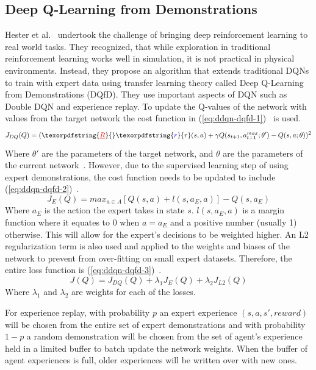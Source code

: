 \documentclass[12pt,american]{report}
\providecommand{\DIFaddtex}[1]{{\protect\color{blue}\uwave{#1}}} %
\providecommand{\DIFdeltex}[1]{{\protect\color{red}\sout{#1}}}                      %
\providecommand{\DIFaddbegin}{} %
\providecommand{\DIFaddend}{} %
\providecommand{\DIFdelbegin}{} %
\providecommand{\DIFdelend}{} %
\providecommand{\DIFadd}[1]{\texorpdfstring{\DIFaddtex{#1}}{#1}} %
\providecommand{\DIFdel}[1]{\texorpdfstring{\DIFdeltex{#1}}{}} %
\newcommand{\DIFscaledelfig}{0.5}
\newlength{\DIFdelgraphicswidth} %
\newlength{\DIFdelgraphicsheight} %
\newcommand{\DIFaddincludegraphics}[2][]{{\color{blue}\fbox{\DIFOincludegraphics[#1]{#2}}}} %
\newcommand{\DIFdelincludegraphics}[2][]{%
\sbox{\DIFdelgraphicsbox}{\DIFOincludegraphics[#1]{#2}}%
\settoboxwidth{\DIFdelgraphicswidth}{\DIFdelgraphicsbox} %
\settoboxtotalheight{\DIFdelgraphicsheight}{\DIFdelgraphicsbox} %
\scalebox{\DIFscaledelfig}{%
\parbox[b]{\DIFdelgraphicswidth}{\usebox{\DIFdelgraphicsbox}\\[-\baselineskip] \rule{\DIFdelgraphicswidth}{0em}}\llap{\resizebox{\DIFdelgraphicswidth}{\DIFdelgraphicsheight}{%
\setlength{\unitlength}{\DIFdelgraphicswidth}%
\begin{picture}(1,1)%
\thicklines\linethickness{2pt} %
{\color[rgb]{1,0,0}\put(0,0){\framebox(1,1){}}}%
{\color[rgb]{1,0,0}\put(0,0){\line( 1,1){1}}}%
{\color[rgb]{1,0,0}\put(0,1){\line(1,-1){1}}}%
\end{picture}%
}\hspace*{3pt}}} %
} %
\DeclareRobustCommand{\DIFaddbegin}{\DIFOaddbegin \let\includegraphics\DIFaddincludegraphics} %
\DeclareRobustCommand{\DIFaddend}{\DIFOaddend \let\includegraphics\DIFOincludegraphics} %
\DeclareRobustCommand{\DIFdelbegin}{\DIFOdelbegin \let\includegraphics\DIFdelincludegraphics} %
\DeclareRobustCommand{\DIFdelend}{\DIFOaddend \let\includegraphics\DIFOincludegraphics} %
\begin{document}
\DIFaddend \subsection{Deep Q-Learning from Demonstrations}
Hester et al.~\cite{hester2017learning} undertook the challenge of bringing deep reinforcement learning to real world tasks.  They recognized, that while exploration in traditional reinforcement learning works well in simulation, it is not practical in physical environments.  Instead, they propose an algorithm that extends traditional DQNs to train with expert data using transfer learning theory called Deep Q-Learning from Demonstrations (DQfD).  They use important aspects of DQN such as Double DQN and experience replay.  To update the Q-values of the network with values from the target network the cost function in (\ref{eq:ddqn-dqfd-1})~\cite{hester2017learning} is used.
\begin{equation}
     \label{eq:ddqn-dqfd-1}
     J_{DQ}(Q) =(\DIFdelbegin \DIFdel{R}\DIFdelend \DIFaddbegin \DIFadd{r}\DIFaddend (s,a)+\gamma Q(s_{t+1},a^{max}_{t+1};\theta')-Q(s,a;\theta))^2%
\end{equation}
Where $\theta'$ are the parameters of the target network, and $\theta$ are the parameters of the current network~\cite{van2016deep}.  However, due to the supervised learning step of using expert demonstrations, the cost function needs to be updated to include (\ref{eq:ddqn-dqfd-2})~\cite{hester2017learning}.
\begin{equation}
     \label{eq:ddqn-dqfd-2}
     J_{E}(Q) =max_{a\in A}[Q(s,a)+l(s,a_E,a)]-Q(s,a_E)%
\end{equation}
Where $a_E$ is the action the expert takes in state $s$.  $l(s,a_E,a)$ is a margin function where it equates to 0 when $a=a_E$ and a positive number (usually 1) otherwise.  This will allow for the expert's decisions to be weighted higher.  An L2 regularization term is also used and applied to the weights and biases of the network to prevent from over-fitting on small expert datasets.  Therefore, the entire loss function is (\ref{eq:ddqn-dqfd-3})~\cite{hester2017learning}.
\begin{equation}
     \label{eq:ddqn-dqfd-3}
     J(Q) =J_{DQ}(Q) + \lambda_1J_E(Q) + \lambda_2J_{L2}(Q)%
\end{equation}
Where $\lambda_1$ and $\lambda_2$ are weights for each of the losses. 

For experience replay, with probability $p$ an expert experience $(s,a,s',reward)$ will be chosen from the entire set of expert demonstrations and with probability $1-p$ a random demonstration will be chosen from the set of agent's experience held in a limited buffer to batch update the network weights.  When the buffer of agent experiences is full, older experiences will be written over with new ones.  
\end{document}
